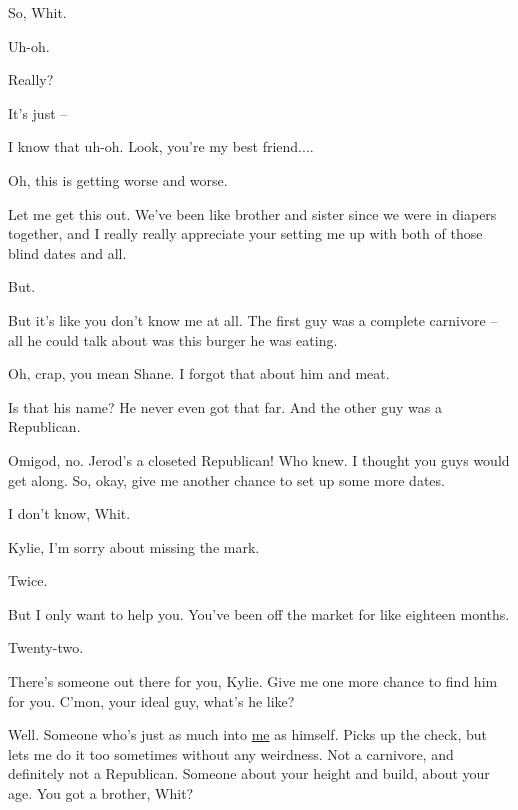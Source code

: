\scene
{}

\ky
So, Whit.

\wh
Uh-oh.

\ky
Really?

\wh
It’s just --

\ky
I know that uh-oh.  Look, you’re my best friend....

\wh
Oh, this is getting worse and worse.

\ky
Let me get this out.  We’ve been like brother and sister since we were in diapers together, and I really really appreciate your setting me up with both of those blind dates and all.

\wh
But.

\ky
But it’s like you don’t know me at all.  The first guy was a complete carnivore -- all he could talk about was this burger he was eating.

\wh
Oh, crap, you mean Shane.  I forgot that about him and meat.

\ky
Is that his name?  He never even got that far.  And the other guy was a Republican.

\wh
Omigod, no.  Jerod’s a closeted Republican!  Who knew.  I thought you guys would get along.  So, okay, give me another chance to set up some more dates.

\ky
I don’t know, Whit.

\wh
Kylie, I’m sorry about missing the mark.

\ky
Twice.

\wh
But I only want to help you.  You’ve been off the market for like eighteen months.

\ky
Twenty-two.

\wh
There’s someone out there for you, Kylie.  Give me one more chance to find him for you.  C’mon, your ideal guy, what’s he like?

\ky
Well.  Someone who’s just as much into \underline{me} as himself.  Picks up the check, but lets me do it too sometimes without any weirdness. Not a carnivore, and definitely not a Republican.  Someone about your height and build, about your age.  You got a brother, Whit?



